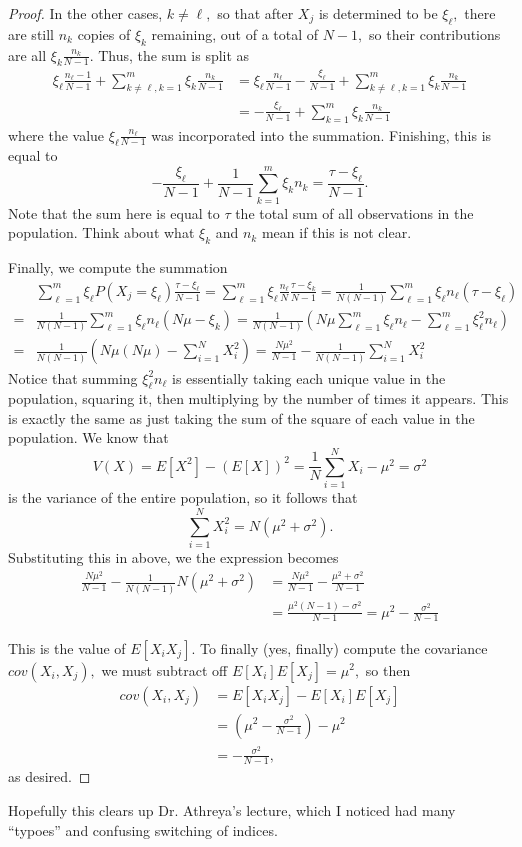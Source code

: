 \documentclass{article}
\begin{document}
\begin{proof}
	In the other cases, $k\neq\ell,$ so that after $X_j$ is determined to be $\xi_\ell,$ there are still $n_k$ copies of $\xi_k$ remaining, out of a total of $N-1,$ so their contributions are all $\xi_k\frac{n_k}{N-1}.$ Thus, the sum is split as 
	\begin{align*}
		\xi_\ell\frac{n_\ell-1}{N-1}+\sum_{k\neq\ell, k=1}^m \xi_k\frac{n_k}{N-1}&=\xi_\ell\frac{n_\ell}{N-1}-\frac{\xi_\ell}{N-1}+\sum_{k\neq\ell, k=1}^m \xi_k\frac{n_k}{N-1} \\
		&= -\frac{\xi_\ell}{N-1}+\sum_{k=1}^m \xi_k\frac{n_k}{N-1}
	\end{align*} where the value $\xi_\ell\frac{n_\ell}{N-1}$ was incorporated into the summation. Finishing, this is equal to \[-\frac{\xi_\ell}{N-1}+\frac{1}{N-1}\sum_{k=1}^m \xi_k n_k=\frac{\tau-\xi_\ell}{N-1}.\] Note that the sum here is equal to $\tau$ the total sum of all observations in the population. Think about what $\xi_k$ and $n_k$ mean if this is not clear.

	Finally, we compute the summation
\begin{align*}
&\sum_{\ell=1}^m \xi_\ell P(X_j=\xi_\ell)\frac{\tau-\xi_\ell}{N-1} = \sum_{\ell=1}^m \xi_\ell \frac{n_\ell}{N}\frac{\tau-\xi_k}{N-1}=\frac{1}{N(N-1)}\sum_{\ell=1}^m \xi_\ell n_\ell (\tau-\xi_\ell) \\
= &\frac{1}{N(N-1)}\sum_{\ell=1}^m\xi_\ell n_\ell (N\mu-\xi_k) = \frac{1}{N(N-1)}\left( N\mu\sum_{\ell=1}^m \xi_\ell n_\ell - \sum_{\ell=1}^m \xi_\ell^2 n_\ell \right) \\
= &\frac{1}{N(N-1)}\left( N\mu(N\mu) - \sum_{i=1}^N X_i^2\right) = \frac{N\mu^2}{N-1} - \frac{1}{N(N-1)}\sum_{i=1}^N X_i^2
\end{align*}
Notice that summing $\xi_\ell^2 n_\ell$ is essentially taking each unique value in the population, squaring it, then multiplying by the number of times it appears. This is exactly the same as just taking the sum of the square of each value in the population. We know that \[V(X)=E[X^2]-(E[X])^2=\frac{1}{N}\sum_{i=1}^N X_i - \mu^2 = \sigma^2 \] is the variance of the entire population, so it follows that \[\sum_{i=1}^N X_i^2 = N(\mu^2+\sigma^2).\] Substituting this in above, we the expression becomes 
\begin{align*}
	\frac{N\mu^2}{N-1} - \frac{1}{N(N-1)}N(\mu^2+\sigma^2) &= \frac{N\mu^2}{N-1} - \frac{\mu^2+\sigma^2}{N-1} \\
	&= \frac{\mu^2(N-1) - \sigma^2}{N-1} = \mu^2 - \frac{\sigma^2}{N-1}
\end{align*}

This is the value of $E[X_iX_j].$ To finally (yes, finally) compute the covariance $cov(X_i, X_j),$ we must subtract off $E[X_i]E[X_j]=\mu^2,$ so then 
\begin{align*}
	cov(X_i, X_j) &= E[X_iX_j]-E[X_i]E[X_j] \\
	&= \left( \mu^2-\frac{\sigma^2}{N-1} \right) - \mu^2 \\
	&= -\frac{\sigma^2}{N-1},
\end{align*} as desired.
\end{proof}

Hopefully this clears up Dr. Athreya's lecture, which I noticed had many ``typoes'' and confusing switching of indices. 
\end{document}
